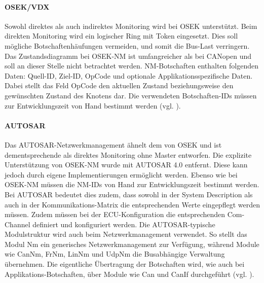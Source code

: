 \documentclass[
  a4paper,					    %
  twoside,
  DIV=calc,     				%
  bibliography=totoc,
  cleardoublepage=empty,
  ngerman,     					%
  final       					%
]{scrbook}
\begin{document}
\paragraph{OSEK/VDX}
Sowohl direktes als auch indirektes Monitoring wird bei OSEK unterstützt. Beim direkten Monitoring wird ein logischer Ring mit Token eingesetzt. Dies soll mögliche Botschaftenhäufungen vermeiden, und somit die Bus-Last verringern. Das Zustandsdiagramm bei OSEK-NM ist umfangreicher als bei CANopen und soll an dieser Stelle nicht betrachtet werden. NM-Botschaften enthalten folgenden Daten: Quell-ID, Ziel-ID, OpCode und optionale Applikationsspezifische Daten. Dabei stellt das Feld OpCode den aktuellen Zustand beziehungsweise den gewünschten Zustand des Knotens dar. Die verwendeten Botschaften-IDs müssen zur Entwicklungszeit von Hand bestimmt werden (vgl. \cite{nm_osek}\cite{ZimmermannSchmidgall201011}).

\paragraph{AUTOSAR}
Das AUTOSAR-Netzwerkmanagement ähnelt dem von OSEK und ist dementsprechende als direktes Monitoring ohne Master entworfen. Die explizite Unterstützung von OSEK-NM wurde mit AUTOSAR 4.0 entfernt. Diese kann jedoch durch eigene Implementierungen ermöglicht werden. Ebenso wie bei OSEK-NM müssen die NM-IDs von Hand zur Entwicklungszeit bestimmt werden. Bei AUTOSAR bedeutet dies zudem, dass sowohl in der System Description als auch in der Kommunikations-Matrix die entsprechenden Werte eingepflegt werden müssen. Zudem müssen bei der ECU-Kon\-fi\-gu\-ra\-tion die entsprechenden Com-Channel definiert und konfiguriert werden. Die AUTOSAR-typische Modulstruktur wird auch beim Netzwerkmanagement verwendet. So stellt das Modul Nm ein generisches Netzwerkmanagement zur Verfügung, während Module wie CanNm, FrNm, LinNm und UdpNm die Busabhängige Verwaltung übernehmen. Die eigentliche Übertragung der Botschaften wird, wie auch bei Applikations-Botschaften, über Module wie Can und CanIf durchgeführt (vgl. \cite{nm_fr}\cite{ZimmermannSchmidgall201011}).



\end{document}
